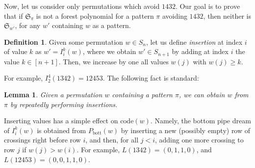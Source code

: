 \documentclass{article}
\newtheorem{lemma}[theorem]{Lemma}
\theoremstyle{definition} %
\newtheorem{definition}[theorem]{Definition}
\begin{document}
Now, let us consider only permutations which avoid $1432$. Our goal is to prove that if $\mathfrak{S}_{\pi}$ is not a forest polynomial for a pattern $\pi$ avoiding $1432$, then neither is $\mathfrak{S}_{w'}$, for any $w'$ containing $w$ as a pattern.
\vspace{1em}


\begin{definition}\label{def:insertion}
    Given some permutation $w \in S_n$, let us define \textit{insertion} at index $i$ of value $k$ as $w' = I_i^k(w)$, where we obtain $w' \in S_{n+1}$ by adding at index $i$ the value $k\in [n+1]$. Then, we increase by one all values $w(j)$ with $w(j) \ge k$. 
\end{definition}

For example, $I_2^4(1342) = 12453$. The following fact is standard:
\vspace{1em}

\begin{lemma}\label{lemma:insertion}
    Given a permutation $w$ containing a pattern $\pi$, we can obtain $w$ from $\pi$ by repeatedly performing insertions.
\end{lemma}

    Inserting values has a simple effect on $\text{code}(w)$. Namely, the bottom pipe dream of $I_i^k(w)$ is obtained from $P_{\text{bott}}(w)$ by inserting a new (possibly empty) row of crossings right before row $i$, and then, for all $j < i$, adding one more crossing to row $j$ if $w(j) > w(i)$. For example, $L(1342) = (0,1,1,0)$, and $L(12453) = (0,0, 1, 1, 0)$. 
\end{document}
